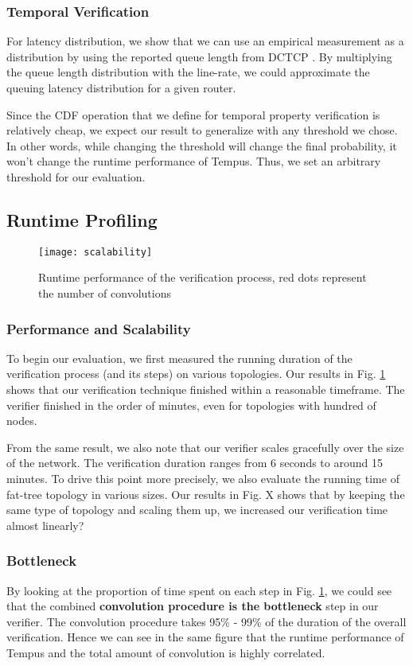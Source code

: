 \subsubsection{Temporal Verification}
For latency distribution, we show that we can use an empirical measurement as a distribution by 
using the reported queue length from DCTCP \cite{dctcp}.
By multiplying the queue length distribution with the line-rate, we could approximate the queuing 
latency distribution for a given router. 

Since the CDF operation that we define for temporal property verification is relatively cheap, 
we expect our result to generalize with any threshold we chose. 
In other words, while changing the threshold will change the final probability, it won't change 
the runtime performance of Tempus.
Thus, we set an arbitrary threshold for our evaluation.

\subsection{Runtime Profiling}

\begin{figure}[h]
    \centering
    \texttt{[image: scalability]}
    \caption{Runtime performance of the verification process, red dots represent the number of convolutions}
    \label{fig:scalability}
\end{figure}

\subsubsection{Performance and Scalability}
To begin our evaluation, we first measured the running duration of the verification process (and its steps) 
on various topologies.
Our results in Fig. \ref{fig:scalability} shows that our verification technique finished within a reasonable timeframe.
The verifier finished in the order of minutes, even for topologies with hundred of nodes.

From the same result, we also note that our verifier scales gracefully over the size of the network.
The verification duration ranges from 6 seconds to around 15 minutes. 
To drive this point more precisely, we also evaluate the running time of fat-tree topology in various sizes.
Our results in Fig. X shows that by keeping the same type of topology and scaling them up, we increased 
our verification time almost linearly? 

\subsubsection{Bottleneck}
By looking at the proportion of time spent on each step in Fig. \ref{fig:scalability}, we could see that 
the combined \textbf{convolution procedure is the bottleneck} step in our verifier.
The convolution procedure takes 95\% - 99\% of the duration of the overall verification.
Hence we can see in the same figure that the runtime performance of Tempus and the total amount 
of convolution is highly correlated.

